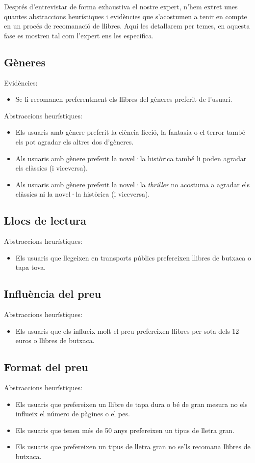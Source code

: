 Després d'entrevistar de forma exhaustiva el nostre expert, n'hem extret unes quantes abstraccions heurístiques i evidències que s'acostumen a tenir en compte en un procés de recomanació de llibres. Aquí les detallarem per temes, en aquesta fase es mostren tal com l'expert ens les especifica.

\subsection{Gèneres}
Evidències:
\begin{itemize}
  \item Se li recomanen preferentment els llibres del gèneres preferit de l'usuari.
\end{itemize}
Abstraccions heurístiques:
\begin{itemize}
  \item Els usuaris amb gènere preferit la ciència ficció, la fantasia o el terror també els pot agradar els altres dos d'gèneres.
  \item Als usuaris amb gènere preferit la novel·la històrica també li poden agradar els clàssics (i viceversa).
  \item Als usuaris amb gènere preferit la novel·la \emph{thriller} no acostuma a agradar els clàssics ni la novel·la històrica (i viceversa).
\end{itemize}

\subsection{Llocs de lectura}
Abstraccions heurístiques:
\begin{itemize}
  \item Els usuaris que llegeixen en transports públics prefereixen llibres de butxaca o tapa tova.
\end{itemize}

\subsection{Influència del preu}
Abstraccions heurístiques:
\begin{itemize}
  \item Els usuaris que els influeix molt el preu prefereixen llibres per sota dels 12 euros o llibres de butxaca.
\end{itemize}

\subsection{Format del preu}
Abstraccions heurístiques:
\begin{itemize}
  \item Els usuaris que prefereixen un llibre de tapa dura o bé de gran mesura no els influeix el número de pàgines o el pes.
  \item Els usuaris que tenen més de 50 anys prefereixen un tipus de lletra gran.
  \item Els usuaris que prefereixen un tipus de lletra gran no se'ls recomana llibres de butxaca.
\end{itemize}

